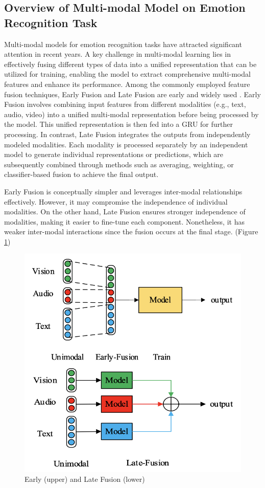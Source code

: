 \documentclass{article}
\begin{document}
\subsection{Overview of Multi-modal Model on Emotion Recognition Task}
Multi-modal models for emotion recognition tasks have attracted significant attention in recent years. A key challenge in multi-modal learning lies in effectively fusing different types of data into a unified representation that can be utilized for training, enabling the model to extract comprehensive multi-modal features and enhance its performance. Among the commonly employed feature fusion techniques, Early Fusion and Late Fusion are early and widely used \cite{Baltruaitis2017MultimodalML}. Early Fusion involves combining input features from different modalities (e.g., text, audio, video) into a unified multi-modal representation before being processed by the model. This unified representation is then fed into a GRU for further processing. In contrast, Late Fusion integrates the outputs from independently modeled modalities. Each modality is processed separately by an independent model to generate individual representations or predictions, which are subsequently combined through methods such as averaging, weighting, or classifier-based fusion to achieve the final output.

Early Fusion is conceptually simpler and leverages inter-modal relationships effectively. However, it may compromise the independence of individual modalities. On the other hand, Late Fusion ensures stronger independence of modalities, making it easier to fine-tune each component. Nonetheless, it has weaker inter-modal interactions since the fusion occurs at the final stage. (Figure \ref{fig:early-late-fusion})

\begin{figure}[ht]
    \centering
    \includegraphics[width=1\linewidth]{figs/Early and Late Fusion.png}
    \caption{Early (upper) and Late Fusion (lower) \cite{Wu2022}}
    \label{fig:early-late-fusion}
\end{figure}
\end{document}
